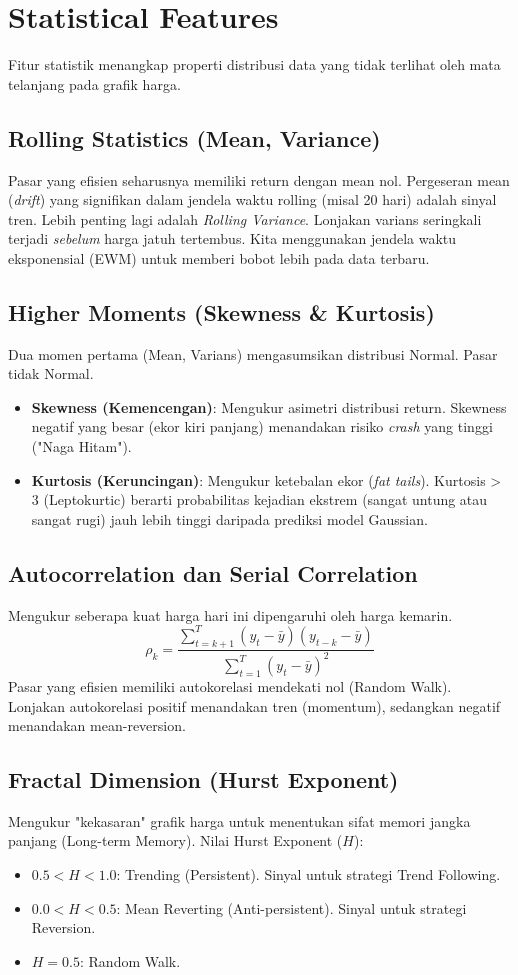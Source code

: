 \documentclass[12pt,a4paper]{book}
\begin{document}
\section{Statistical Features}
Fitur statistik menangkap properti distribusi data yang tidak terlihat oleh mata telanjang pada grafik harga.

\subsection{Rolling Statistics (Mean, Variance)}
Pasar yang efisien seharusnya memiliki return dengan mean nol. Pergeseran mean (\textit{drift}) yang signifikan dalam jendela waktu rolling (misal 20 hari) adalah sinyal tren. Lebih penting lagi adalah \textit{Rolling Variance}. Lonjakan varians seringkali terjadi \textit{sebelum} harga jatuh tertembus. Kita menggunakan jendela waktu eksponensial (EWM) untuk memberi bobot lebih pada data terbaru.

\subsection{Higher Moments (Skewness & Kurtosis)}
Dua momen pertama (Mean, Varians) mengasumsikan distribusi Normal. Pasar tidak Normal.
\begin{itemize}
    \item \textbf{Skewness (Kemencengan)}: Mengukur asimetri distribusi return. Skewness negatif yang besar (ekor kiri panjang) menandakan risiko \textit{crash} yang tinggi ("Naga Hitam").
    \item \textbf{Kurtosis (Keruncingan)}: Mengukur ketebalan ekor (\textit{fat tails}). Kurtosis > 3 (Leptokurtic) berarti probabilitas kejadian ekstrem (sangat untung atau sangat rugi) jauh lebih tinggi daripada prediksi model Gaussian.
\end{itemize}

\subsection{Autocorrelation dan Serial Correlation}
Mengukur seberapa kuat harga hari ini dipengaruhi oleh harga kemarin.
\[ \rho_k = \frac{\sum_{t=k+1}^T (y_t - \bar{y})(y_{t-k} - \bar{y})}{\sum_{t=1}^T (y_t - \bar{y})^2} \]
Pasar yang efisien memiliki autokorelasi mendekati nol (Random Walk). Lonjakan autokorelasi positif menandakan tren (momentum), sedangkan negatif menandakan mean-reversion.

\subsection{Fractal Dimension (Hurst Exponent)}
Mengukur "kekasaran" grafik harga untuk menentukan sifat memori jangka panjang (Long-term Memory). Nilai Hurst Exponent ($H$):
\begin{itemize}
    \item $0.5 < H < 1.0$: Trending (Persistent). Sinyal untuk strategi Trend Following.
    \item $0.0 < H < 0.5$: Mean Reverting (Anti-persistent). Sinyal untuk strategi Reversion.
    \item $H = 0.5$: Random Walk.
\end{itemize}
\end{document}
